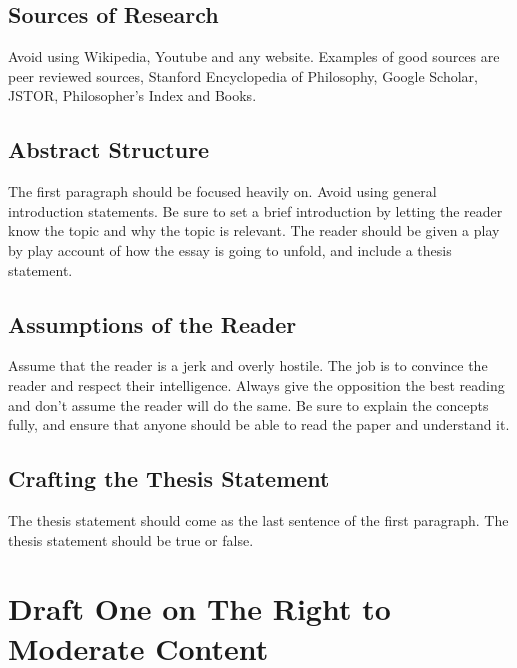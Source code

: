 \documentclass[a4paper]{article}
\begin{document}
\subsection{Sources of Research}
Avoid using Wikipedia, Youtube and any website. Examples of good sources are peer reviewed sources, Stanford 
Encyclopedia of Philosophy, Google Scholar, JSTOR, Philosopher's Index and Books.

\subsection{Abstract Structure}
The first paragraph should be focused heavily on. Avoid using general introduction statements. Be sure to set a brief
introduction by letting the reader know the topic and why the topic is relevant. The reader should be given a play by
play account of how the essay is going to unfold, and include a thesis statement. 

\subsection{Assumptions of the Reader}
Assume that the reader is a jerk and overly hostile. The job is to convince the reader and respect their intelligence.
Always give the opposition the best reading and don't assume the reader will do the same. Be sure to explain the 
concepts fully, and ensure that anyone should be able to read the paper and understand it. 

\subsection{Crafting the Thesis Statement}
The thesis statement should come as the last sentence of the first paragraph. The thesis statement should be true or
false. 

\newpage

\section{Draft One on The Right to Moderate Content}
\end{document}
